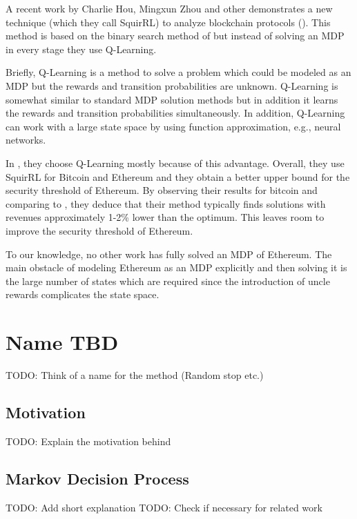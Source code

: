 \documentclass{article}
\begin{document}
A recent work by Charlie Hou, Mingxun Zhou and other demonstrates a new technique (which they call SquirRL) to analyze blockchain protocols (\cite{hou2019squirrl}). This method is based on the binary search method of \cite{sapirshtein2016optimal} but instead of solving an MDP in every stage they use Q-Learning.

Briefly, Q-Learning is a method to solve a problem which could be modeled as an MDP but the rewards and transition probabilities are unknown. Q-Learning is somewhat similar to standard MDP solution methods but in addition it learns the rewards and transition probabilities simultaneously. In addition, Q-Learning can work with a large state space by using function approximation, e.g., neural networks.

In \cite{hou2019squirrl}, they choose Q-Learning mostly because of this advantage. Overall, they use SquirRL for Bitcoin and Ethereum and they obtain a better upper bound for the security threshold of Ethereum. By observing their results for bitcoin and comparing to \cite{sapirshtein2016optimal}, they deduce that their method typically finds solutions with revenues approximately 1-2\% lower than the optimum. This leaves room to improve the security threshold of Ethereum.

To our knowledge, no other work has fully solved an MDP of Ethereum. The main obstacle of modeling Ethereum as an MDP explicitly and then solving it is the large number of states which are required since the introduction of uncle rewards complicates the state space.

\section{Name TBD}


TODO: Think of a name for the method (Random stop etc.)
\subsection{Motivation}
TODO: Explain the motivation behind 


\subsection{Markov Decision Process}
TODO: Add short explanation
TODO: Check if necessary for related work
\end{document}

